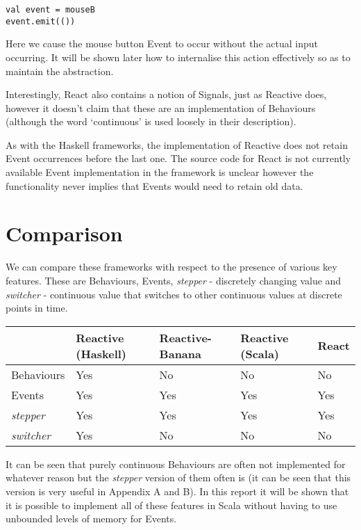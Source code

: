 \begin{verbatim}
val event = mouseB
event.emit(())
\end{verbatim}      

      Here we cause the mouse button Event to occur without the actual input occurring. It will be shown later how to     
      internalise this action effectively so as to maintain the abstraction. 

      Interestingly, React also contains a notion of Signals, just as Reactive does, 
      however it doesn't claim that these are an implementation of Behaviours (although the word `continuous' is
      used loosely in their description). 
      
      As with the Haskell frameworks, the implementation of Reactive does not retain Event occurrences before the
      last one. The source code for React is not currently available Event implementation in the framework is unclear
      however the functionality never implies that Events would need to retain old data.
      
\section{Comparison}
  We can compare these frameworks with respect to the presence of various key features. These are Behaviours, Events, 
  \emph{stepper} - discretely 
  changing value and \emph{switcher} - continuous value that switches to other continuous values at discrete points in time.
  
  \begin{center}
     \begin{tabular}{ | l | l | l | l | l | }
       \hline
        & Reactive (Haskell) & Reactive-Banana & Reactive (Scala) & React \\ \hline \hline
       Behaviours & Yes & No & No & No \\ \hline
       Events & Yes & Yes & Yes & Yes \\ \hline
       \emph{stepper} & Yes & Yes & Yes & Yes \\ \hline
       \emph{switcher} & Yes & No & No & No \\ \hline  
       \hline
     \end{tabular}
   \end{center}
   
   It can be seen that purely continuous Behaviours are often not implemented for whatever reason
   but the \emph{stepper} version
   of them often is (it can be seen that this version is very useful in Appendix A and B). In this report it will
   be shown that it is possible to implement all of these features in Scala without having to use unbounded levels
   of memory for Events.